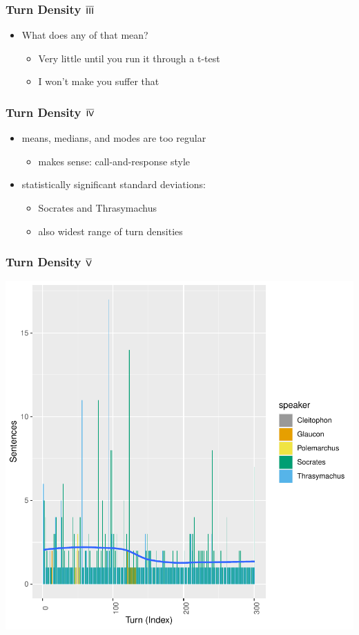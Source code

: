 \documentclass{beamer}
\renewcommand{\Roman}[1]{$\overline{\textsf{\small{\MakeUppercase{\romannumeral #1}}}}$}
\begin{document}
\begin{frame}
\frametitle{Turn Density \Roman{3}}
\begin{itemize}
\item What does any of that mean?
  \begin{itemize}
  \item Very little until you run it through a t-test
  \item I won't make you suffer that
  \end{itemize}
\end{itemize}
\end{frame}



\begin{frame}
\frametitle{Turn Density \Roman{4}}
\begin{itemize}
\item means, medians, and modes are too regular
  \begin{itemize}
  \item makes sense: call-and-response style
  \end{itemize}
\item statistically significant standard deviations:
  \begin{itemize}
  \item Socrates and Thrasymachus
  \item also widest range of turn densities
  \end{itemize}
\end{itemize}
\end{frame}



\begin{frame}
\frametitle{Turn Density \Roman{5}}
\includegraphics{GreatSlideshow-006}
\end{frame}
\end{document}
